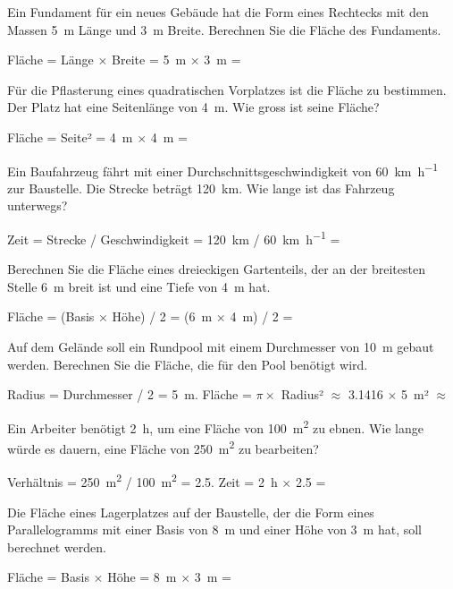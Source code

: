 \begin{questions}
  \question Ein Fundament für ein neues Gebäude hat die Form eines Rechtecks mit den Massen \SI{5}{\metre} Länge und \SI{3}{\metre} Breite. Berechnen Sie die Fläche des Fundaments.
  \begin{solution}
  Fläche = Länge $\times$ Breite = \SI{5}{\metre} $\times$ \SI{3}{\metre} = 
  \end{solution}

  \question Für die Pflasterung eines quadratischen Vorplatzes ist die Fläche zu bestimmen. Der Platz hat eine Seitenlänge von \SI{4}{\metre}. Wie gross ist seine Fläche?
  \begin{solution}
  Fläche = Seite² = \SI{4}{\metre} $\times$ \SI{4}{\metre} = 
  \end{solution}

  \question Ein Baufahrzeug fährt mit einer Durchschnittsgeschwindigkeit von \SI{60}{\kilo\metre\per\hour} zur Baustelle. Die Strecke beträgt \SI{120}{\kilo\metre}. Wie lange ist das Fahrzeug unterwegs?
  \begin{solution}
  Zeit = Strecke / Geschwindigkeit = \SI{120}{\kilo\metre} / \SI{60}{\kilo\metre\per\hour} = 
  \end{solution}

  \question Berechnen Sie die Fläche eines dreieckigen Gartenteils, der an der breitesten Stelle \SI{6}{\metre} breit ist und eine Tiefe von \SI{4}{\metre} hat.
  \begin{solution}
  Fläche = (Basis $\times$ Höhe) / 2 = (\SI{6}{\metre} $\times$ \SI{4}{\metre}) / 2 = 
  \end{solution}

  \question Auf dem Gelände soll ein Rundpool mit einem Durchmesser von \SI{10}{\metre} gebaut werden. Berechnen Sie die Fläche, die für den Pool benötigt wird.
  \begin{solution}
  Radius = Durchmesser / 2 = \SI{5}{\metre}. Fläche = $\pi \times$ Radius² $\approx$ 3.1416 $\times$ \SI{5}{\metre}² $\approx$ 
  \end{solution}

  \question Ein Arbeiter benötigt \SI{2}{\hour}, um eine Fläche von \SI{100}{\square\metre} zu ebnen. Wie lange würde es dauern, eine Fläche von \SI{250}{\square\metre} zu bearbeiten?
  \begin{solution}
  Verhältnis = \SI{250}{\square\metre} / \SI{100}{\square\metre} = 2.5. Zeit = \SI{2}{\hour} $\times$ 2.5 = 
  \end{solution}
  \pagebreaksol
  \question Die Fläche eines Lagerplatzes auf der Baustelle, der die Form eines Parallelogramms mit einer Basis von \SI{8}{\metre} und einer Höhe von \SI{3}{\metre} hat, soll berechnet werden.
  \begin{solution}
  Fläche = Basis $\times$ Höhe = \SI{8}{\metre} $\times$ \SI{3}{\metre} = 
  \end{solution}


\end{questions}
